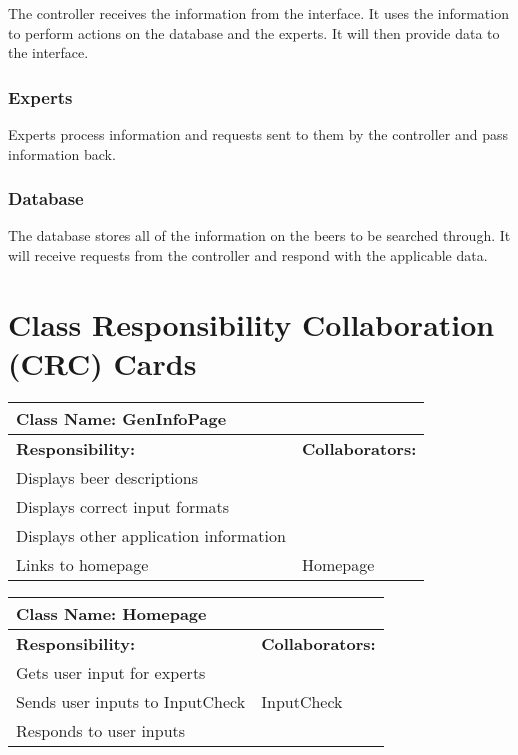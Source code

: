 \documentclass[]{article}
\begin{document}
The controller receives the information from the interface. It uses the information to perform actions on the database and the
experts. It will then provide data to the interface.

\subsubsection{Experts}

Experts process information and requests sent to them by the controller and pass information back.

\subsubsection{Database}

The database stores all of the information on the beers to be searched through. It will receive requests from the controller
and respond with the applicable data.



	
\section{Class Responsibility Collaboration (CRC) Cards}
\label{sec:class_responsibility_collaboration_crc_cards}

\begin{table}[ht]
		\centering
		\begin{tabular}{|p{5cm}|p{5cm}|}
			\hline 
			\multicolumn{2}{|l|}{\textbf{Class Name: GenInfoPage}} \\
			\hline
			\textbf{Responsibility:} & \textbf{Collaborators:} \\
			\hline
			Displays beer descriptions & \\
			\hline				
			Displays correct input formats & \\
			\hline
			Displays other application information &  \\
			\hline
			Links to homepage & Homepage \\
			\hline
		\end{tabular}
	\end{table}	
	
\begin{table}[ht]
		\centering
		\begin{tabular}{|p{5cm}|p{5cm}|}
			\hline 
			\multicolumn{2}{|l|}{\textbf{Class Name: Homepage}} \\
			\hline
			\textbf{Responsibility:} & \textbf{Collaborators:} \\
			\hline
			Gets user input for experts & \\
			\hline
			Sends user inputs to InputCheck & InputCheck\\	
			\hline
			Responds to user inputs & \\	
			\hline
		\end{tabular}
	\end{table}	
\end{document}
